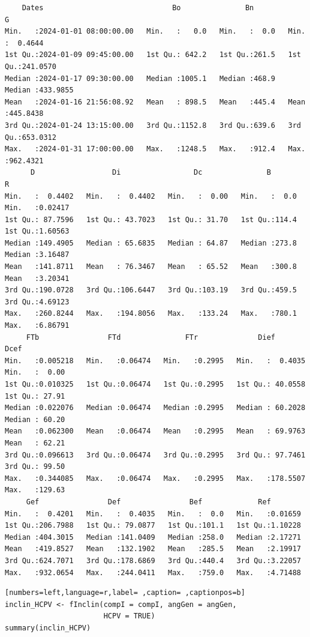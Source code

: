 \begin{itemize}
\begin{verbatim}
    Dates                              Bo               Bn              G           
Min.   :2024-01-01 08:00:00.00   Min.   :   0.0   Min.   :  0.0   Min.   :  0.4644  
1st Qu.:2024-01-09 09:45:00.00   1st Qu.: 642.2   1st Qu.:261.5   1st Qu.:241.0570  
Median :2024-01-17 09:30:00.00   Median :1005.1   Median :468.9   Median :433.9855  
Mean   :2024-01-16 21:56:08.92   Mean   : 898.5   Mean   :445.4   Mean   :445.8438  
3rd Qu.:2024-01-24 13:15:00.00   3rd Qu.:1152.8   3rd Qu.:639.6   3rd Qu.:653.0312  
Max.   :2024-01-31 17:00:00.00   Max.   :1248.5   Max.   :912.4   Max.   :962.4321  
      D                  Di                 Dc               B               R          
Min.   :  0.4402   Min.   :  0.4402   Min.   :  0.00   Min.   :  0.0   Min.   :0.02417  
1st Qu.: 87.7596   1st Qu.: 43.7023   1st Qu.: 31.70   1st Qu.:114.4   1st Qu.:1.60563  
Median :149.4905   Median : 65.6835   Median : 64.87   Median :273.8   Median :3.16487  
Mean   :141.8711   Mean   : 76.3467   Mean   : 65.52   Mean   :300.8   Mean   :3.20341  
3rd Qu.:190.0728   3rd Qu.:106.6447   3rd Qu.:103.19   3rd Qu.:459.5   3rd Qu.:4.69123  
Max.   :260.8244   Max.   :194.8056   Max.   :133.24   Max.   :780.1   Max.   :6.86791  
     FTb                FTd               FTr              Dief               Dcef       
Min.   :0.005218   Min.   :0.06474   Min.   :0.2995   Min.   :  0.4035   Min.   :  0.00  
1st Qu.:0.010325   1st Qu.:0.06474   1st Qu.:0.2995   1st Qu.: 40.0558   1st Qu.: 27.91  
Median :0.022076   Median :0.06474   Median :0.2995   Median : 60.2028   Median : 60.20  
Mean   :0.062300   Mean   :0.06474   Mean   :0.2995   Mean   : 69.9763   Mean   : 62.21  
3rd Qu.:0.096613   3rd Qu.:0.06474   3rd Qu.:0.2995   3rd Qu.: 97.7461   3rd Qu.: 99.50  
Max.   :0.344085   Max.   :0.06474   Max.   :0.2995   Max.   :178.5507   Max.   :129.63  
     Gef                Def                Bef             Ref         
Min.   :  0.4201   Min.   :  0.4035   Min.   :  0.0   Min.   :0.01659  
1st Qu.:206.7988   1st Qu.: 79.0877   1st Qu.:101.1   1st Qu.:1.10228  
Median :404.3015   Median :141.0409   Median :258.0   Median :2.17271  
Mean   :419.8527   Mean   :132.1902   Mean   :285.5   Mean   :2.19917  
3rd Qu.:624.7071   3rd Qu.:178.6869   3rd Qu.:440.4   3rd Qu.:3.22057  
Max.   :932.0654   Max.   :244.0411   Max.   :759.0   Max.   :4.71488
\end{verbatim}

\begin{lstlisting}[numbers=left,language=r,label= ,caption= ,captionpos=b]
inclin_HCPV <- fInclin(compI = compI, angGen = angGen,
                       HCPV = TRUE)
summary(inclin_HCPV)
\end{lstlisting}


\end{itemize}
